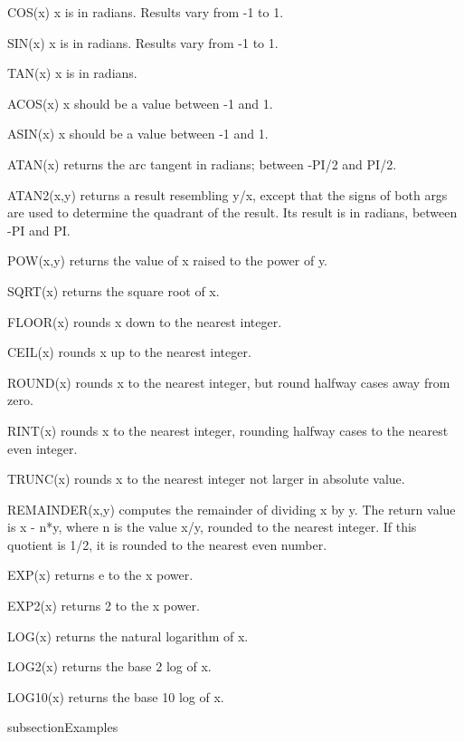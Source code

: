 \begin{Enumerate}
\item COS(x) x is in radians. Results vary from -1 to 1. 
\item SIN(x) x is in radians. Results vary from -1 to 1.
\item TAN(x) x is in radians.
\item ACOS(x) x should be a value between -1 and 1.
\item ASIN(x) x should be a value between -1 and 1.
\item ATAN(x) returns the arc tangent in radians; between -PI/2 and PI/2.
\item ATAN2(x,y) returns a result resembling y/x, except that the signs of both args are used to determine the quadrant of the result. Its result is in radians, between -PI and PI.
\item POW(x,y) returns the value of x raised to the power of y.
\item SQRT(x) returns the square root of x.
\item FLOOR(x) rounds x down to the nearest integer.
\item CEIL(x) rounds x up to the nearest integer.
\item ROUND(x) rounds x to the nearest integer, but round halfway cases away from zero.
\item RINT(x) rounds x to the nearest integer, rounding halfway cases to the nearest even integer.
\item TRUNC(x) rounds x to the nearest integer not larger in absolute value.
\item REMAINDER(x,y) computes the remainder of dividing x by y. The return value is x - n*y, where n is the value x/y, rounded to the nearest integer.
If this quotient is 1/2, it is rounded to the nearest even number.
\item EXP(x) returns e to the x power.
\item EXP2(x) returns 2 to the x power.
\item LOG(x) returns the natural logarithm of x.
\item LOG2(x) returns the base 2 log of x.
\item LOG10(x) returns the base 10 log of x.
\end{Enumerate}

subsection{Examples}

